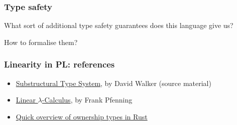 \begin{frame}
  \frametitle{Type safety}
  What sort of additional type safety guarantees does this language
  give us?

  \bigskip
  How to formalise them?
\end{frame}


\begin{frame}
  \frametitle{Linearity in PL: references}
  \begin{itemize}
  \item
    \href{https://mitpress.mit.edu/sites/default/files/titles/content/9780262162289_sch_0001.pdf}{Substructural
      Type System}, by David Walker (source material)
%
  \item
    \href{https://www.cs.cmu.edu/~./fp/courses/15816-f01/handouts/linlam.pdf}{Linear
      $\lambda$-Calculus}, by Frank Pfenning
  \item
    \href{http://nercury.github.io/rust/guide/2015/01/19/ownership.html}{Quick
      overview of ownership types in Rust}
  \end{itemize}
\end{frame}


